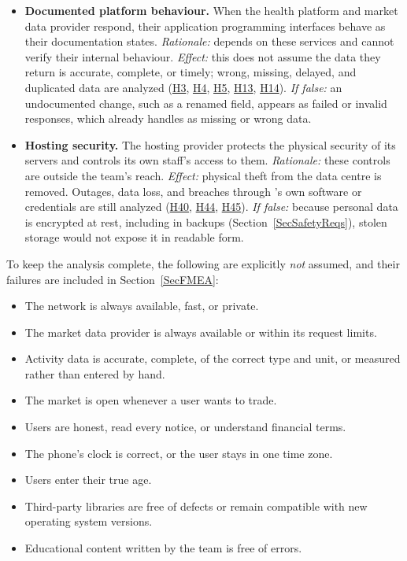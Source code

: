 \documentclass{article}
\begin{document}
\begin{itemize}
  \item[CA4:] \textbf{Documented platform behaviour.} When the health platform
        and market data provider respond, their application programming interfaces
        behave as their documentation states. \emph{Rationale:} \progname{} depends
        on these services and cannot verify their internal behaviour.
        \emph{Effect:} this does not assume the data they return is accurate,
        complete, or timely; wrong, missing, delayed, and duplicated data are
        analyzed (\hyperref[H3]{H3}, \hyperref[H4]{H4}, \hyperref[H5]{H5}, \hyperref[H13]{H13}, \hyperref[H14]{H14}). \emph{If false:} an undocumented change,
        such as a renamed field, appears as failed or invalid responses, which
        \progname{} already handles as missing or wrong data.
  \item[CA5:] \textbf{Hosting security.} The hosting provider protects the
        physical security of its servers and controls its own staff's access to them.
        \emph{Rationale:} these controls are outside the team's reach.
        \emph{Effect:} physical theft from the data centre is removed. Outages, data
        loss, and breaches through \progname{}'s own software or credentials are
        still analyzed (\hyperref[H40]{H40}, \hyperref[H44]{H44}, \hyperref[H45]{H45}). \emph{If false:} because personal
        data is encrypted at rest, including in backups
        (Section~\ref{SecSafetyReqs}), stolen storage would not expose it in
        readable form.
\end{itemize}

To keep the analysis complete, the following are explicitly \emph{not}
assumed, and their failures are included in Section~\ref{SecFMEA}:

\begin{itemize}
  \item The network is always available, fast, or private.
  \item The market data provider is always available or within its request
        limits.
  \item Activity data is accurate, complete, of the correct type and unit, or
        measured rather than entered by hand.
  \item The market is open whenever a user wants to trade.
  \item Users are honest, read every notice, or understand financial terms.
  \item The phone's clock is correct, or the user stays in one time zone.
  \item Users enter their true age.
  \item Third-party libraries are free of defects or remain compatible with new
        operating system versions.
  \item Educational content written by the team is free of errors.
\end{itemize}
\end{document}
